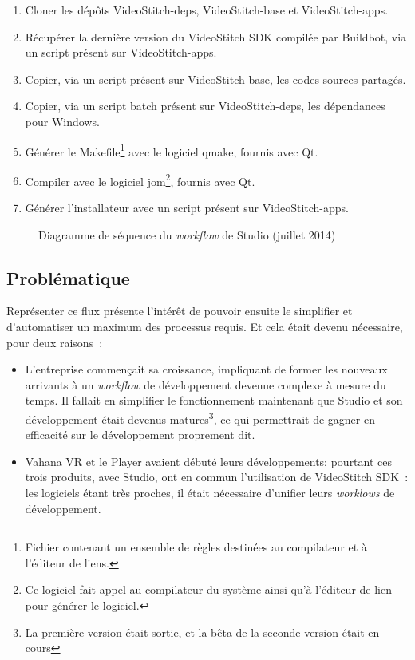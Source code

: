 \begin{enumerate}
  \item Cloner les dépôts VideoStitch-deps, VideoStitch-base et VideoStitch-apps.
  \item Récupérer la dernière version du VideoStitch SDK compilée par Buildbot, 
  via un script présent sur VideoStitch-apps.
  \item Copier, via un script présent sur VideoStitch-base, les codes sources partagés.
  \item Copier, via un script batch présent sur VideoStitch-deps, les dépendances pour Windows.
  \item Générer le Makefile\footnote{Fichier contenant un ensemble de règles destinées
  au compilateur et à l'éditeur de liens.} avec le logiciel qmake, fournis avec Qt.
  \item Compiler avec le logiciel jom\footnote{Ce logiciel fait appel au compilateur 
  du système ainsi qu'à l'éditeur de lien pour générer le logiciel.}, fournis avec Qt.
  \item Générer l'installateur avec un script présent sur VideoStitch-apps.
\end{enumerate}
\begin{figure}
  \centering
  \caption{Diagramme de séquence du \textit{workflow} de Studio (juillet 2014)}
	\label{workflow-studio}
\end{figure}
  
\subsection{Problématique}
Représenter ce flux présente l'intérêt de pouvoir ensuite le simplifier et d'automatiser
un maximum des processus requis. Et cela était devenu nécessaire, pour deux raisons~:
\begin{itemize}
  \item L'entreprise commençait sa croissance, impliquant de former les nouveaux arrivants
  à un \textit{workflow} de développement devenue complexe à mesure du temps. Il fallait en
  simplifier le fonctionnement maintenant que Studio et son développement était
  devenus matures\footnote{La première version était sortie, et la bêta de la seconde
  version était en cours}, ce qui permettrait de gagner en efficacité sur le développement
  proprement dit.
  \item Vahana VR et le Player avaient débuté leurs développements; pourtant ces trois
  produits, avec Studio, ont en commun l'utilisation de VideoStitch SDK~: les logiciels
  étant très proches, il était nécessaire d'unifier leurs \textit{worklows} de développement.
\end{itemize}

